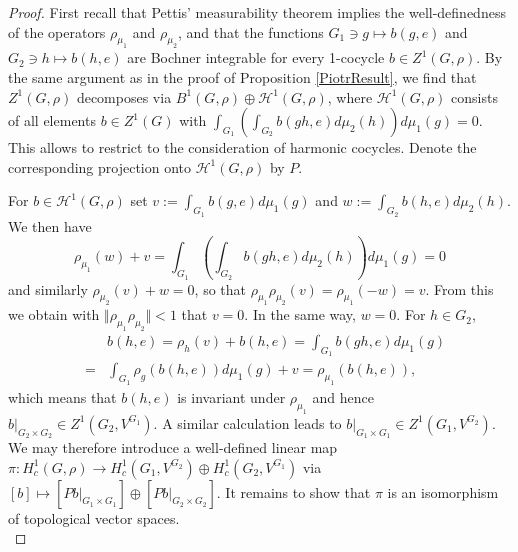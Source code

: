 \documentclass[10pt,a4paper]{amsart}
\begin{document}
\begin{proof} First recall that Pettis' measurability theorem implies the well-definedness of the operators $\rho_{\mu_{1}}$ and $\rho_{\mu_{2}}$, and that the functions $G_{1}\ni g\mapsto b(g,e)$ and $G_{2}\ni h\mapsto b(h,e)$ are Bochner integrable for every 1-cocycle $b\in Z^{1}(G,\rho)$. By the same argument as in the proof of Proposition \ref{PiotrResult}, we find that $Z^{1}(G,\rho)$ decomposes via $B^{1}(G,\rho)\oplus\mathcal{H}^{1}(G,\rho)$, where $\mathcal{H}^{1}(G,\rho)$ consists of all elements $b\in Z^{1}(G)$ with $\int_{G_{1}}(\int_{G_{2}}b(gh,e)d\mu_{2}(h))d\mu_{1}(g)=0$. This allows to restrict to the consideration of harmonic cocycles. Denote the corresponding projection onto $\mathcal{H}^{1}(G,\rho)$ by $P$.

For $b\in\mathcal{H}^{1}(G,\rho)$ set $v:=\int_{G_{1}}b(g,e)d\mu_{1}(g)$ and $w:=\int_{G_{2}}b(h,e)d\mu_{2}(h)$. We then have 
\[
\rho_{\mu_{1}}(w)+v=\int_{G_{1}}\left(\int_{G_{2}}b(gh,e)d\mu_{2}(h)\right)d\mu_{1}(g)=0
\]
and similarly $\rho_{\mu_{2}}(v)+w=0$, so that $\rho_{\mu_{1}}\rho_{\mu_{2}}(v)=\rho_{\mu_{1}}(-w)=v$. From this we obtain with $\Vert\rho_{\mu_{1}}\rho_{\mu_{2}}\Vert<1$ that $v=0$. In the same way, $w=0$. For $h\in G_{2}$, 
\begin{eqnarray*}
 &  & b(h,e)=\rho_{h}(v)+b(h,e)=\int_{G_{1}}b(gh,e)d\mu_{1}(g)\\
 & = & \int_{G_{1}}\rho_{g}\left(b(h,e)\right)d\mu_{1}(g)+v=\rho_{\mu_{1}}\left(b(h,e)\right),
\end{eqnarray*}
which means that $b(h,e)$ is invariant under $\rho_{\mu_1}$ and hence $b|_{G_{2}\times G_{2}}\in Z^{1}(G_{2},V^{G_{1}})$. A similar calculation leads to $b|_{G_{1}\times G_{1}}\in Z^{1}(G_{1},V^{G_{2}})$. We may therefore introduce a well-defined linear map $\pi:H_{c}^{1}(G,\rho)\rightarrow H_{c}^{1}(G_{1},V^{G_{2}})\oplus H_{c}^{1}(G_{2},V^{G_{1}})$ via $[b]\mapsto[Pb|_{G_{1}\times G_{1}}]\oplus[Pb|_{G_{2}\times G_{2}}]$. It remains to show that $\pi$ is an isomorphism of topological vector spaces.\\


\end{proof}
\end{document}
